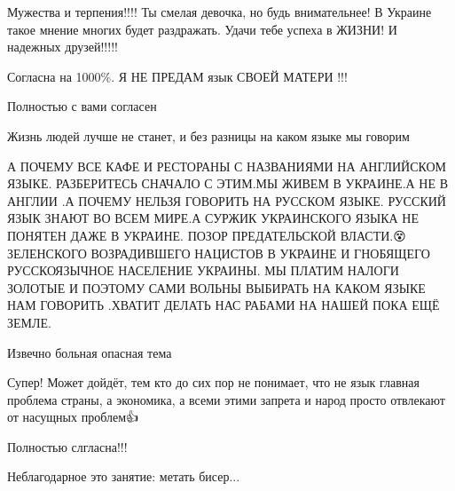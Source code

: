 \begin{itemize}
Мужества и терпения!!!! Ты смелая девочка, но будь внимательнее! В Украине такое мнение многих будет раздражать. Удачи тебе успеха в ЖИЗНИ! И надежных друзей!!!!!

Согласна на 1000\%. Я НЕ ПРЕДАМ язык СВОЕЙ МАТЕРИ !!!

Полностью с вами согласен

Жизнь людей лучше не станет, и без разницы на каком языке мы говорим


А ПОЧЕМУ ВСЕ КАФЕ И РЕСТОРАНЫ С НАЗВАНИЯМИ НА АНГЛИЙСКОМ ЯЗЫКЕ. РАЗБЕРИТЕСЬ
СНАЧАЛО С ЭТИМ.МЫ ЖИВЕМ В УКРАИНЕ.А НЕ В АНГЛИИ .А ПОЧЕМУ НЕЛЬЗЯ ГОВОРИТЬ НА
РУССКОМ ЯЗЫКЕ. РУССКИЙ ЯЗЫК ЗНАЮТ ВО ВСЕМ МИРЕ.А СУРЖИК УКРАИНСКОГО ЯЗЫКА НЕ
ПОНЯТЕН ДАЖЕ В УКРАИНЕ. ПОЗОР ПРЕДАТЕЛЬСКОЙ ВЛАСТИ.😵 ЗЕЛЕНСКОГО ВОЗРАДИВШЕГО
НАЦИСТОВ В УКРАИНЕ И ГНОБЯЩЕГО РУССКОЯЗЫЧНОЕ НАСЕЛЕНИЕ УКРАИНЫ. МЫ ПЛАТИМ
НАЛОГИ ЗОЛОТЫЕ И ПОЭТОМУ САМИ ВОЛЬНЫ ВЫБИРАТЬ НА КАКОМ ЯЗЫКЕ НАМ ГОВОРИТЬ
.ХВАТИТ ДЕЛАТЬ НАС РАБАМИ НА НАШЕЙ ПОКА ЕЩЁ ЗЕМЛЕ.

Извечно больная опасная тема

Супер! Может дойдёт, тем кто до сих пор не понимает, что не язык главная
проблема страны, а экономика, а всеми этими запрета и народ просто отвлекают от
насущных проблем👍

Полностью слгласна!!!

Неблагодарное это занятие: метать бисер...

\end{itemize}

